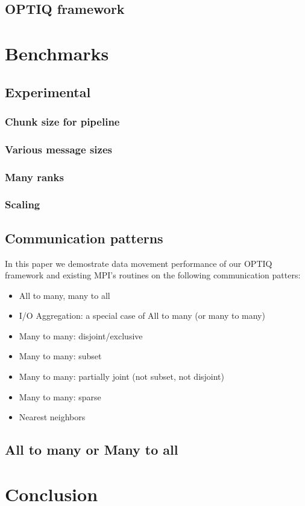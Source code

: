 \documentclass[letter]{article}
\begin{document}
\subsection{OPTIQ framework}

\section{Benchmarks}

\subsection{Experimental }
\subsubsection{Chunk size for pipeline}
\subsubsection{Various message sizes}
\subsubsection{Many ranks}
\subsubsection{Scaling}

\subsection{Communication patterns}
In this paper we demostrate data movement performance of our OPTIQ framework and existing MPI's routines on the following communication patters:

\begin{itemize}
\item All to many, many to all
\item I/O Aggregation: a special case of All to many (or many to many)
\item Many to many: disjoint/exclusive
\item Many to many: subset
\item Many to many: partially joint (not subset, not disjoint)
\item Many to many: sparse
\item Nearest neighbors
\end{itemize}

\subsection{All to many or Many to all}

\section{Conclusion}
\end{document}

